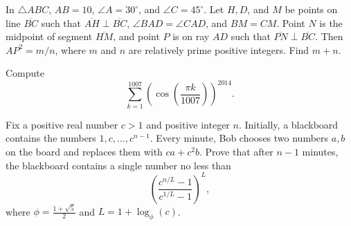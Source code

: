 %	













\begin{question}[name={2014 AIME II, \href{https://artofproblemsolving.com/community/c4p3444121}{Problem 14}}]
	In $\triangle ABC$, $AB=10$, $\angle A=30^\circ$, and $\angle C=45^\circ$. Let $H,D$, and $M$ be points on line $\overline{BC}$ such that $\overline{AH}\perp\overline{BC}$, $\angle BAD=\angle CAD$, and $BM=CM$. Point $N$ is the midpoint of segment $\overline{HM}$, and point $P$ is on ray $AD$ such that $\overline{PN}\perp\overline{BC}$. Then $AP^2={m}/{n}$, where $m$ and $n$ are relatively prime positive integers. Find $m+n$.
\end{question}


%	








\begin{question}[name={2014 HMMT, Guts, \href{https://artofproblemsolving.com/community/c129h603992p3586759}{Problem 31}}]
	Compute\[\sum_{k=1}^{1007}\left(\cos\left(\dfrac{\pi k}{1007}\right)\right)^{2014}.\]
\end{question}




%	







\begin{question}[name={2014 HMMT, Team, \href{https://artofproblemsolving.com/community/c129h578715p3414359}{Problem 10}}]
	Fix a positive real number $c>1$ and positive integer $n$. Initially, a blackboard contains the numbers $1,c,\ldots, c^{n-1}$. Every minute, Bob chooses two numbers $a,b$ on the board and replaces them with $ca+c^2b$. Prove that after $n-1$ minutes, the blackboard contains a single number no less than\[\left(\dfrac{c^{n/L}-1}{c^{1/L}-1}\right)^L,\]where $\phi=\tfrac{1+\sqrt 5}2$ and $L=1+\log_\phi(c)$.
\end{question}




